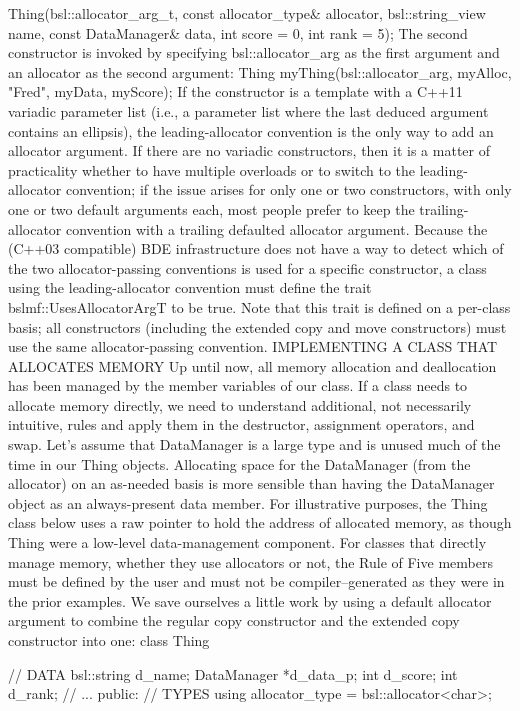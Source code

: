 {{    Thing(bsl::allocator_arg_t,
          const allocator_type& allocator,
          bsl::string_view      name,
          const DataManager&    data,
          int                   score = 0,
          int                   rank  = 5);
The second constructor is invoked by specifying bsl::allocator_arg as the first argument and an allocator as the second argument:
Thing myThing(bsl::allocator_arg, myAlloc, "Fred", myData, myScore);
If the constructor is a template with a C++11 variadic parameter list (i.e., a parameter list where the last deduced argument contains an ellipsis), the leading-allocator convention is the only way to add an allocator argument.  If there are no variadic constructors, then it is a matter of practicality whether to have multiple overloads or to switch to the leading-allocator convention; if the issue arises for only one or two constructors, with only one or two default arguments each, most people prefer to keep the trailing-allocator convention with a trailing defaulted allocator argument. Because the (C++03 compatible) BDE infrastructure does not have a way to detect which of the two allocator-passing conventions is used for a specific constructor, a class using the leading-allocator convention must define the trait bslmf::UsesAllocatorArgT to be true. Note that this trait is defined on a per-class basis; all constructors (including the extended copy and move constructors) must use the same allocator-passing convention.
IMPLEMENTING A CLASS THAT ALLOCATES MEMORY
Up until now, all memory allocation and deallocation has been managed by the member variables of our class. If a class needs to allocate memory directly, we need to understand additional, not necessarily intuitive, rules and apply them in the destructor, assignment operators, and swap.
Let’s assume that DataManager is a large type and is unused much of the time in our Thing objects. Allocating space for the DataManager (from the allocator) on an as-needed basis is more sensible than having the DataManager object as an always-present data member. For illustrative purposes, the Thing class below uses a raw pointer to hold the address of allocated memory, as though Thing were a low-level data-management component. For classes that directly manage memory, whether they use allocators or not, the Rule of Five members must be defined by the user and must not be compiler–generated as they were in the prior examples. We save ourselves a little work by using a default allocator argument to combine the regular copy constructor and the extended copy constructor into one:
class Thing {
    // DATA
    bsl::string  d_name;
    DataManager *d_data_p;
    int          d_score;
    int          d_rank;
    // ...
  public:
    // TYPES
    using allocator_type = bsl::allocator<char>;

}}}
